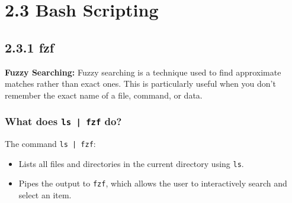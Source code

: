 \documentclass[12pt]{article}
\begin{document}
\section*{2.3 Bash Scripting}

\subsection*{2.3.1 fzf}
\textbf{Fuzzy Searching:} Fuzzy searching is a technique used to find approximate matches rather than exact ones. This is particularly useful when you don't remember the exact name of a file, command, or data.

\subsubsection*{What does \texttt{ls | fzf} do?}
The command \texttt{ls | fzf}:
\begin{itemize}
    \item Lists all files and directories in the current directory using \texttt{ls}.
    \item Pipes the output to \texttt{fzf}, which allows the user to interactively search and select an item.
\end{itemize}
\end{document}
